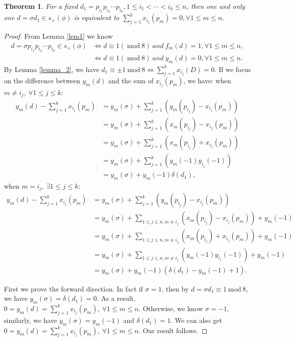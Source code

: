 \documentclass{amsart}
\numberwithin{equation}{section}
\theoremstyle{plain}
\newtheorem{thm_}[equation]{Theorem}
\theoremstyle{definition}
\newcommand{\thm}[1]{\begin{thm_}#1\end{thm_}}
\newcommand{\pf}[1]{\begin{proof}#1\end{proof}}
\renewcommand{\mod}[1]{\ \mathrm{mod}\ #1}  %
\begin{document}
\thm{\label{thm3}For a fixed $d_1 = p_{i_1}p_{i_2} \cdots p_{i_k}, 1\le i_1 < \cdots < i_k \le n$, then one and only one $d = \sigma d_1 \in s_+(\phi)$ is equivalent to $ \sum\limits_{j=1}^k x_{i_j}(p_m) = 0, \forall 1 \le m \le n$.
}
\pf{From Lemma \ref{lem1} we know
$$
\begin{aligned}
d = \sigma p_{i_1}p_{i_2} \cdots p_{i_k}  \in s_+(\phi) & \Leftrightarrow d \equiv 1 (\mod 8) \ and \  f_{m}(d) = 1, \forall 1\leq m \leq n, \\
&\Leftrightarrow d \equiv 1 (\mod 8) \ and  \ y_{m}(d) = 0, \forall 1\leq m \leq n .
\end{aligned}
$$
By Lemma \ref{lemma_2}, we have $d_1 \equiv \pm 1 \mod 8 \Leftrightarrow \sum\limits_{j = 1}^k x_{i_j}(D) = 0$.
If we focus on the difference between $y_m(d)$ and the sum of $x_{i_j}(p_m)$, we have:
when $m \neq i_j, \ \forall 1 \le j \le k$:
	$$
	\begin{aligned}
	y_m(d) - \sum\limits_{j=1}^k x_{i_j}(p_m) & = y_m(\sigma) + \sum\limits_{j=1}^k (y_m(p_{i_j}) - x_{i_j}(p_m))\\
	& =  y_m(\sigma) +\sum\limits_{j=1}^k (x_m(p_{i_j}) - x_{i_j}(p_m))\\
	& =  y_m(\sigma) +\sum\limits_{j=1}^k (x_m(p_{i_j}) + x_{i_j}(p_m))\\
	& =  y_m(\sigma) +\sum\limits_{j=1}^k (y_m(-1) y_{i_j}(-1))\\
	& =  y_m(\sigma) +y_m(-1)\delta(d_1),
	\end{aligned}
	$$
when $ m = i_j, \ \exists 1 \le j \le k $:
	$$
	\begin{aligned}
	y_m(d) - \sum\limits_{j=1}^k x_{i_j}(p_m) & =  y_m(\sigma) + \sum\limits_{j=1}^k (y_m(p_{i_j}) - x_{i_j}(p_m))\\
	& =  y_m(\sigma) + \sum\limits_{1 \le j \le n ,m \neq i_j} (x_m(p_{i_j}) - x_{i_j}(p_m)) + y_{m}(-1)\\
	& = y_m(\sigma) +  \sum\limits_{1 \le j \le n ,m \neq i_j} (x_m(p_{i_j}) + x_{i_j}(p_m))+ y_{m}(-1)\\
	& =  y_m(\sigma) + \sum\limits_{1 \le j \le n ,m \neq i_j} (y_m(-1) y_{i_j}(-1)) + y_{m}(-1)\\
	& =  y_m(\sigma) + y_m(-1)(\delta(d_1) - y_m(-1) + 1).
	\end{aligned}
	$$

First we prove the forward direction.
In fact if $\sigma = 1$, then by $d = \sigma d_1 \equiv 1 \mod 8$, we have $y_m(\sigma) = \delta(d_1) = 0$. As a result, $0 = y_m(d) = \sum\limits_{j=1}^k x_{i_j}(p_m),\  \forall 1\le m \le n$. Otherwise, we know $\sigma = -1$,
similarly, we have $y_m(\sigma) =  y_m(-1)$ and $\delta(d_1) = 1$. We can also get $0 = y_m(d) = \sum\limits_{j=1}^k x_{i_j}(p_m),\  \forall 1\le m \le n$. Our result follows.

}
\end{document}
